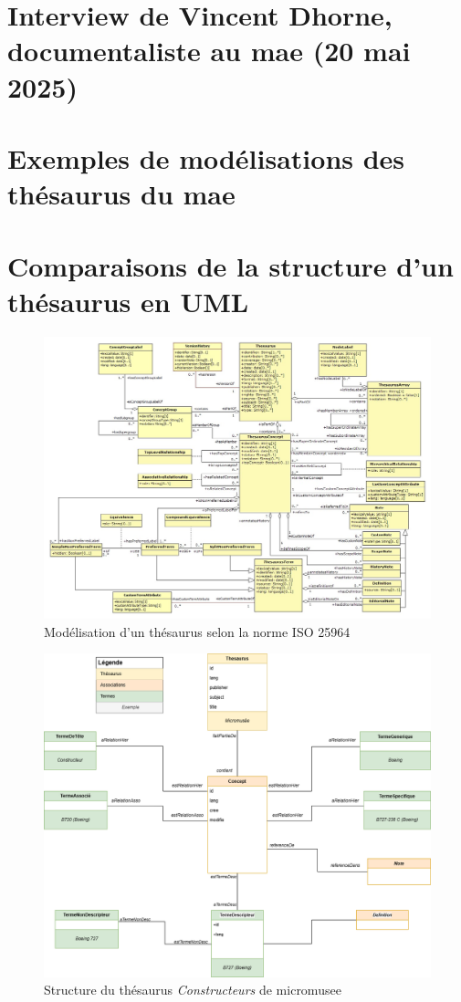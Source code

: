\documentclass[12pt,twoside]{book}
\newcommand{\mae}{\ac{mae} }
\begin{document}
	\chapter[Interview V. Dhorne]{\label{Ax-D}Interview de Vincent Dhorne, documentaliste au \mae (20 mai 2025)}
		
	\newpage{\pagestyle{empty}\cleardoublepage}
	
	\chapter[Modélisations de données]{\label{Ax-E}Exemples de modélisations des thésaurus du \mae}
	
	\chapter[UML]{\label{Ax-F}Comparaisons de la structure d'un thésaurus en UML}
	\begin{figure}
		\centering
		\includegraphics[width=0.7\linewidth]{img/UML_iso}
		\caption{Modélisation d'un thésaurus selon la norme ISO 25964}
		\label{fig:umliso}
	\end{figure}
	\begin{figure}
		\centering
		\includegraphics[width=0.7\linewidth]{img/UML_iso_boeing}
		\caption{Structure du thésaurus \textit{Constructeurs} de \gls{micromusee}}
		\label{fig:umlisoboeing}
	\end{figure}
	
\end{document}
